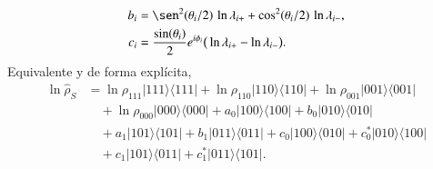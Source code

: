 \begin{appendixs}
\begin{align*}
    b_{i} & = \sen^{2}(\theta_{i}/2)\,\ln \lambda_{i+} + \cos^{2}(\theta_{i}/2)\,\ln \lambda_{i-}, \\
    c_{i} & = \frac{\sin(\theta_{i})}{2}e^{i\phi_{i}} \big(\ln \lambda_{i+} - \ln \lambda_{i-}\big).
\end{align*}
Equivalente y de forma explícita,
\begin{align*}
    \ln \hat{\rho}_{S} & =
    \ln \rho_{111}|111\rangle \langle 111| + \ln \rho_{110}|110\rangle \langle 110| + \ln \rho_{001}|001\rangle \langle 001| \\
     &\quad + \ln \rho_{000}|000\rangle \langle 000|
     + a_{0}|100\rangle \langle 100| + b_{0}|010\rangle \langle 010|  \\
     &\quad + a_{1}|101\rangle \langle 101| + b_{1}|011\rangle\langle 011|
     + c_{0}|100\rangle \langle 010| + c^{*}_{0}|010\rangle \langle 100| \\
     &\quad + c_{1}|101\rangle \langle 011| + c^{*}_{1}|011\rangle \langle 101|.
\end{align*}


\end{appendixs}
